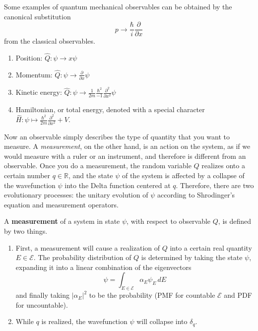 \documentclass{article}
\begin{document}
  \begin{example} 
    Some examples of quantum mechanical observables can be obtained by the canonical substitution 
    \begin{equation} 
      p \rightarrow \frac{\hbar}{i} \frac{\partial}{\partial x} 
    \end{equation}
    from the classical observables. 
      \begin{enumerate} 
        \item Position: $\hat{Q}: \psi \rightarrow x \psi$ 
        \item Momentum: $\hat{Q}: \psi \rightarrow \frac{\partial}{\partial x} \psi $ 
        \item Kinetic energy: $\hat{Q}: \psi \rightarrow \frac{1}{2m} \frac{\hbar^2}{-1} \frac{\partial^2}{\partial x^2} \psi$

        \item Hamiltonian, or total energy, denoted with a special character $\hat{H} : \psi \mapsto \frac{\hbar^2}{2m} \frac{\partial^2}{\partial x^2} + V$. 
      \end{enumerate} 
  \end{example}

  Now an observable simply describes the type of quantity that you want to measure. A \textit{measurement}, on the other hand, is an action on the system, as if we would measure with a ruler or an instrument, and therefore is different from an observable. Once you do a measurement, the random variable $Q$ realizes onto a certain number $q \in \mathbb{R}$, and the state $\psi$ of the system is affected by a collapse of the wavefunction $\psi$ into the Delta function centered at $q$. Therefore, there are two evolutionary processes: the unitary evolution of $\psi$ according to Shrodinger's equation and measurement operators. 

  \begin{definition}[Measurement]
    A \textbf{measurement} of a system in state $\psi$, with respect to observable $Q$, is defined by two things. 
    \begin{enumerate} 
      \item First, a measurement will cause a realization of $Q$ into a certain real quantity $E \in \mathcal{E}$. The probability distribution of $Q$ is determined by taking the state $\psi$, expanding it into a linear combination of the eigenvectors 
      \begin{equation} 
        \psi = \int_{E \in \mathcal{E}}  \alpha_E \psi_E \,dE
      \end{equation}
      and finally taking $|\alpha_E|^2$ to be the probability (PMF for countable $\mathcal{E}$ and PDF for uncountable).  

      \item While $q$ is realized, the wavefunction $\psi$ will collapse into $\delta_q$. 
    \end{enumerate}
  \end{definition}
\end{document}

